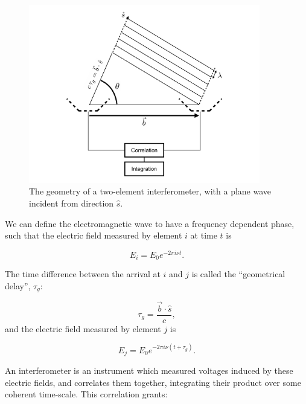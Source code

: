 \begin{figure}
\centering
\includegraphics[width=0.9\textwidth]{chapters/interferometry/figures/visibility_explanation.pdf}
\caption{The geometry of a two-element interferometer, with a plane wave incident from direction $\hat{s}$.}
\label{fig:interferometry_2element}
\end{figure}

We can define the electromagnetic wave to have a frequency dependent phase, such that the electric field measured by element $i$ at time $t$ is

\begin{equation}
E_i = E_0 e^{-2\pi i \nu t}.
\label{eq:Ei}
\end{equation}

The time difference between the arrival at $i$ and $j$ is called the ``geometrical delay'', $\tau_g$:

\begin{equation}
\tau_g = \frac{\vec{b}\cdot\hat{s}}{c},
\end{equation}
and the electric field measured by element $j$ is

\begin{equation}
E_j = E_0 e^{-2\pi i \nu (t+\tau_g)}.
\end{equation}

An interferometer is an instrument which measured voltages induced by these electric fields, and correlates them together, integrating their product over some coherent time-scale. This correlation grants:

